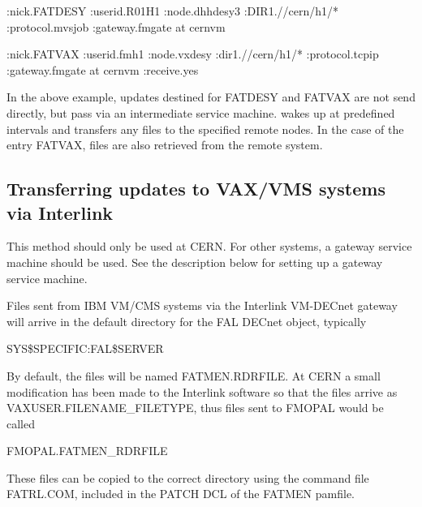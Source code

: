 \begin{XMP}
:nick.FATDESY  :userid.R01H1
               :node.dhhdesy3
               :DIR1.//cern/h1/*
               :protocol.mvsjob
               :gateway.fmgate at cernvm

:nick.FATVAX   :userid.fmh1
               :node.vxdesy
               :dir1.//cern/h1/*
               :protocol.tcpip
               :gateway.fmgate at cernvm
               :receive.yes
\end{XMP}
\par
In the above example, updates destined for FATDESY and FATVAX
are not send directly, but pass via an intermediate service machine.
wakes up at predefined intervals and transfers any files to the specified
remote nodes. In the case of the entry FATVAX, files are also
retrieved from the remote system.
\subsection{Transferring updates to VAX/VMS systems via Interlink}
\par
This method should only be used at CERN. For other systems,
a gateway service machine should be used. See the description
below for setting up a gateway service machine.
\par
Files sent from IBM VM/CMS systems via the Interlink VM-DECnet
gateway will arrive in the default directory for the FAL DECnet
object, typically
\begin{XMP}
SYS\$SPECIFIC:\lsb FAL\$SERVER \rsb
\end{XMP}
\par
By default, the files will be named FATMEN.RDRFILE. At CERN
a small modification has been made to the Interlink software
so that the files arrive as VAXUSER.FILENAME\_FILETYPE,
thus files sent to FMOPAL would be called
\begin{XMP}
FMOPAL.FATMEN_RDRFILE
\end{XMP}
\par
These files can be copied to the correct directory using the
command file FATRL.COM, included in the PATCH DCL of the FATMEN
pamfile.
